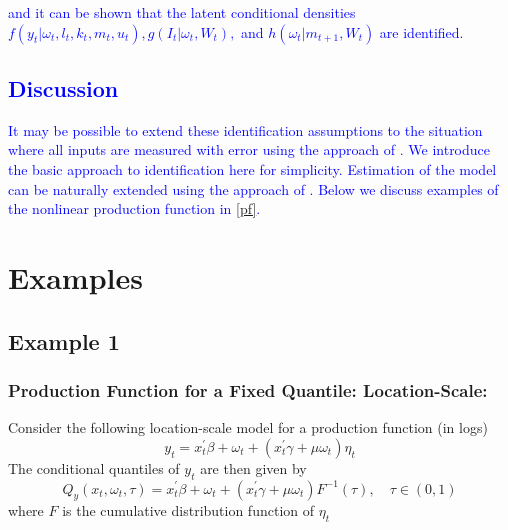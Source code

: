 \documentclass{article}
\begin{document}
\textcolor{blue}{\cite{Hu2008} and \cite{Hu2019} it can be shown that the latent conditional densities $f(y_{t}|\omega_{t}, l_{t}, k_{t}, m_{t}, u_{t}), g(I_{t}|\omega_{t}, W_{t}),$ and $h(\omega_{t}|m_{t+1}, W_{t})$ are identified.}

\textcolor{blue}{
\subsection{Discussion}
It may be possible to extend these identification assumptions to the situation where all inputs are measured with error using the approach of \cite{Song2017}. We introduce the basic approach to identification here for simplicity. Estimation of the model can be naturally extended using the approach of \cite{Wei2009}. Below we discuss examples of the nonlinear production function in \eqref{pf}.}

\section{Examples}
\subsection{Example 1}
\subsubsection{Production Function for a Fixed Quantile: Location-Scale:}
Consider the following location-scale model for a production function (in logs)
\begin{equation}\label{locationscale}
y_{t}=x_{t}^{'}\beta+\omega_{t}+(x_{t}^{'}\gamma+\mu\omega_{t})\eta_{t}
\end{equation}
The conditional quantiles of $y_{t}$ are then given by
\begin{equation}\label{qlocationscale}
Q_{y}(x_{t}, \omega_{t}, \tau)=x_{t}^{'}\beta+\omega_{t}+(x_{t}^{'}\gamma+\mu\omega_{t})F^{-1}(\tau), \quad \tau\in(0,1)
\end{equation}
where $F$ is the cumulative distribution function of $\eta_{t}$\\
\end{document}
